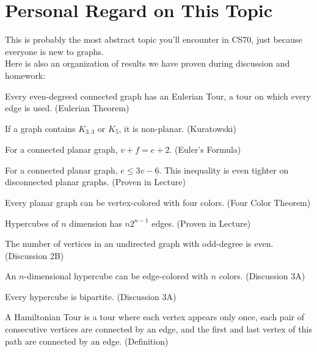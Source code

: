 \section{Personal Regard on This Topic}
This is probably the most abstract topic you'll encounter in CS70, just because everyone is new to graphs. \\
Here is also an organization of results we have proven during discussion and homework:
\begin{bindenum}
    \item Every even-degreed connected graph has an Eulerian Tour, a tour on which every edge is used. (Eulerian Theorem)
    \item If a graph contains $K_{3,3}$ or $K_5$, it is non-planar. (Kuratowski)
    \item For a connected planar graph, $v + f = e + 2$. (Euler's Formula)
    \item For a connected planar graph, $e \leq 3v - 6$. This inequality is even tighter on disconnected planar graphs. (Proven in Lecture)
    \item Every planar graph can be vertex-colored with four colors. (Four Color Theorem)
    \item Hypercubes of $n$ dimension has $n 2^{n - 1}$ edges. (Proven in Lecture)
    \item The number of vertices in an undirected graph with odd-degree is even. (Discussion 2B)
    \item An $n$-dimensional hypercube can be edge-colored with $n$ colors. (Discussion 3A)
    \item Every hypercube is bipartite. (Discussion 3A)
    \item A Hamiltonian Tour is a tour where each vertex appears only once, each pair of consecutive vertices are connected by an edge, and the first and last vertex of this path are connected by an edge. (Definition)
\end{bindenum}
